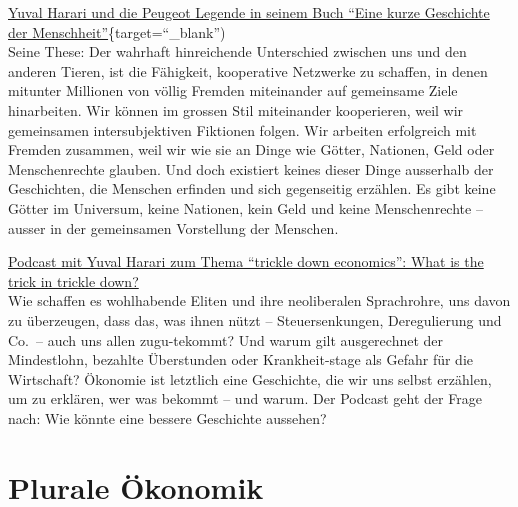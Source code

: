 \documentclass[
  nswissgerman,
  a4paper,
  DIV=11,
  numbers=noendperiod,
  oneside,
  openany]{scrreprt}
\begin{document}
\begin{tcolorbox}[enhanced jigsaw, arc=.35mm, bottomrule=.15mm, bottomtitle=1mm, breakable, colback=white, colbacktitle=quarto-callout-caution-color!10!white, colframe=quarto-callout-caution-color-frame, coltitle=black, left=2mm, leftrule=.75mm, opacityback=0, opacitybacktitle=0.6, rightrule=.15mm, title={Weiterführende Literatur}, titlerule=0mm, toprule=.15mm, toptitle=1mm]

\href{https://ilias.unibe.ch/go/file/3803488}{Yuval Harari und die
Peugeot Legende in seinem Buch ``Eine kurze Geschichte der
Menschheit''}\{target=``\_blank'')\\
Seine These: Der wahrhaft hinreichende Unterschied zwischen uns und den
anderen Tieren, ist die Fähigkeit, kooperative Netzwerke zu schaffen, in
denen mitunter Millionen von völlig Fremden miteinander auf gemeinsame
Ziele hinarbeiten. Wir können im grossen Stil miteinander kooperieren,
weil wir gemeinsamen intersubjektiven Fiktionen folgen. Wir arbeiten
erfolgreich mit Fremden zusammen, weil wir wie sie an Dinge wie Götter,
Nationen, Geld oder Menschenrechte glauben. Und doch existiert keines
dieser Dinge ausserhalb der Geschichten, die Menschen erfinden und sich
gegenseitig erzählen. Es gibt keine Götter im Universum, keine Nationen,
kein Geld und keine Menschenrechte -- ausser in der gemeinsamen
Vorstellung der Menschen.

\href{https://pitchforkeconomics.com/episode/what-is-the-trick-in-trickle-down/}{Podcast
mit Yuval Harari zum Thema ``trickle down economics'': What is the trick
in trickle down?}\\
Wie schaffen es wohlhabende Eliten und ihre neoliberalen Sprachrohre,
uns davon zu überzeugen, dass das, was ihnen nützt -- Steuersenkungen,
Deregulierung und Co.~-- auch uns allen zugu-tekommt? Und warum gilt
ausgerechnet der Mindestlohn, bezahlte Überstunden oder Krankheit-stage
als Gefahr für die Wirtschaft? Ökonomie ist letztlich eine Geschichte,
die wir uns selbst erzählen, um zu erklären, wer was bekommt -- und
warum. Der Podcast geht der Frage nach: Wie könnte eine bessere
Geschichte aussehen?

\end{tcolorbox}

\section{Plurale Ökonomik}\label{plurale-uxf6konomik}
\end{document}
